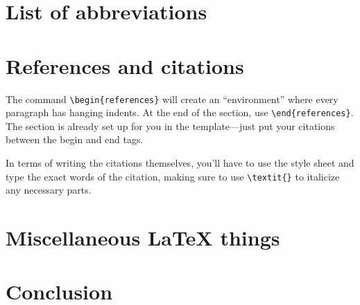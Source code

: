 \documentclass[12pt]{article}
\newenvironment{references}
{\begin{hangparas}{0.5in}{1}}
	{\\ \end{hangparas}}
\begin{document}
	\section{List of abbreviations}
	
	\section{References and citations}
	The command \verb|\begin{references}| will create an ``environment'' where every paragraph has hanging indents. At the end of the section, use \verb|\end{references}|. The section is already set up for you in the template---just put your citations between the begin and end tags.
	
	In terms of writing the citations themselves, you'll have to use the style sheet and type the exact words of the citation, making sure to use \verb|\textit{}| to italicize any necessary parts.
	
	\section{Miscellaneous LaTeX things}
	
	\section{Conclusion}
	
\end{document}
